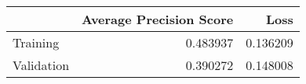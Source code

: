 \begin{tabular}{lrr}
\toprule
{} &  Average Precision Score &      Loss \\
\midrule
Training   &                 0.483937 &  0.136209 \\
Validation &                 0.390272 &  0.148008 \\
\bottomrule
\end{tabular}
